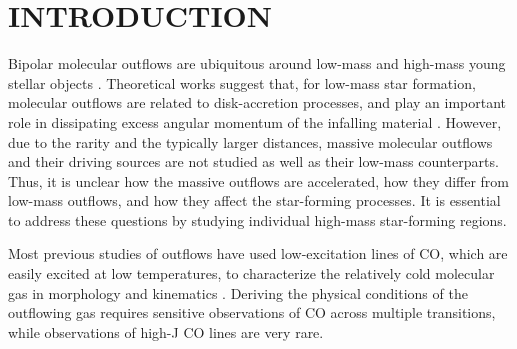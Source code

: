 \section{INTRODUCTION}
Bipolar molecular outflows are ubiquitous around low-mass and high-mass young stellar objects \citep{ 1985ARA&A..23..267L,1993prpl.conf..603F,2001ApJ...552L.167Z,2002A&A...383..892B,2015MNRAS.453..645M}. Theoretical works suggest that, for low-mass star formation, molecular outflows are related to disk-accretion processes, and play an important role in dissipating excess angular momentum of the infalling material \citep{1987ARA&A..25...23S, 1996ARA&A..34..111B}. However, due to the rarity and the typically larger distances, massive molecular outflows and their driving sources are not studied as well as their low-mass counterparts. Thus, it is unclear how the massive outflows are accelerated, how they differ from low-mass outflows, and how they affect the star-forming processes. It is essential to address these questions by studying individual high-mass star-forming regions. 

Most previous studies of outflows have used low-excitation lines of CO, which are easily excited at low temperatures, to characterize the relatively cold molecular gas in morphology and kinematics \citep{2009ApJ...696...66Q,  2009ApJ...702L..66Q, 2011ApJ...728....6Q}. Deriving the physical conditions of the outflowing gas requires sensitive observations of CO across multiple transitions, while observations of high-J CO lines are very rare.

